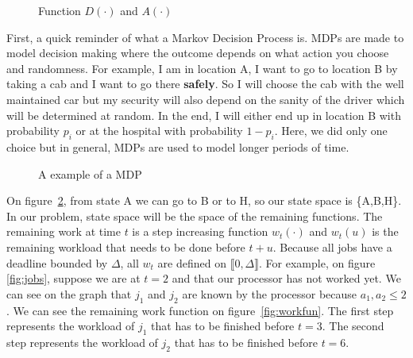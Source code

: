 \documentclass[
10pt, %
a4paper, %
oneside, %
headinclude,footinclude, %
BCOR5mm, %
]{scrartcl}
\begin{document}
\begin{figure}
  \centering
  \caption{Function $D(\cdot)$ and $A(\cdot)$}
  \label{fig:D}
\end{figure}

First, a quick reminder of what a Markov Decision Process is. MDPs are
made to model decision making where the outcome depends on what action
you choose and randomness. For example, I am in location A, I want to
go to location B by taking a cab and I want to go there
\textbf{safely}. So I will choose the cab with the well maintained car
but my security will also depend on the sanity of the driver which
will be determined at random. In the end, I will either end up in
location B with probability $p_i$ or at the hospital with probability
$1-p_i$. Here, we did only one choice but in general, MDPs are
used to model longer periods of time.\\

\begin{figure}
  \centering
 \caption{A example of a MDP}
  \label{fig:mdp}
\end{figure}

On figure~\ref{fig:mdp}, from state A we can go to B or to H, so our state
space is \{A,B,H\}. In our problem, state space will be the space of
the remaining functions. 
The remaining work at time $t$ is a step increasing function
$w_t(\cdot)$ and $w_t(u)$ is the remaining workload that needs to be done before
$t+u$. Because all jobs have a deadline bounded by $\Delta$, all $w_t$ are
defined on $\llbracket 0,\Delta\rrbracket$. For example, on figure
\ref{fig:jobs}, suppose we are at $t=2$ and that our processor has not
worked yet. We can see on the graph that $j_1$ and $j_2$ are known by
the processor because $a_1,a_2\leq 2$. We can see the remaining work
function on figure~\ref{fig:workfun}. The first step represents the
workload of $j_1$ that has to be finished before $t=3$. The second
step represents the workload of $j_2$ that has to be finished before
$t=6$. 
\end{document}
